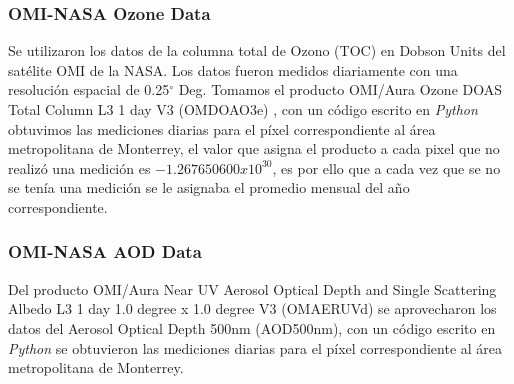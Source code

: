 \subsubsection{OMI-NASA Ozone Data}
Se utilizaron los datos de la columna total de Ozono (TOC) en Dobson Units del satélite OMI de la NASA. Los datos fueron medidos diariamente con una resolución espacial de 0.25$^{\circ}$ Deg. Tomamos el producto OMI/Aura Ozone DOAS Total Column L3 1 day V3 (OMDOAO3e) \cite{OMI_ozone}, con un código escrito en \textit{Python} obtuvimos las mediciones diarias para el píxel correspondiente al área metropolitana de Monterrey, el valor que asigna el producto a cada pixel que no realizó una medición es $-1.267650600x10^{30}$, es por ello que a cada vez que se no se tenía una medición se le asignaba el promedio mensual del año correspondiente.
\subsubsection{OMI-NASA AOD Data}
Del producto OMI/Aura Near UV Aerosol Optical Depth and Single Scattering Albedo L3 1 day 1.0 degree x 1.0 degree V3 (OMAERUVd) \cite{OMI_AOD} se aprovecharon los datos del Aerosol Optical Depth 500nm (AOD500nm), con un código escrito en \textit{Python} se obtuvieron las mediciones diarias para el píxel correspondiente al área metropolitana de Monterrey.